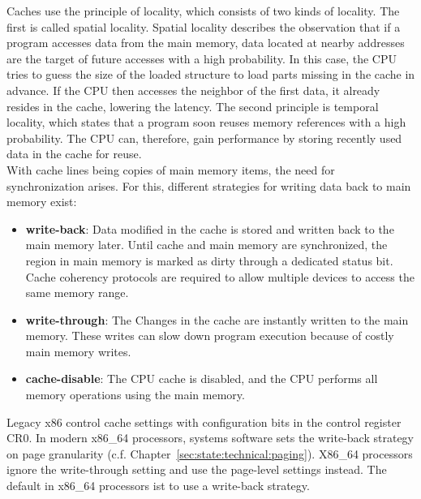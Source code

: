 Caches use the principle of locality, which consists of two kinds of locality.
The first is called spatial locality. Spatial locality describes the observation
that if a program accesses data from the main memory, data located at nearby
addresses are the target of future accesses with a high probability. In this
case, the CPU tries to guess the size of the loaded structure to load parts
missing in the cache in advance. If the CPU then accesses the neighbor of the
first data, it already resides in the cache, lowering the latency. The second
principle is temporal locality, which states that a program soon reuses memory
references with a high probability. The CPU can, therefore, gain performance by
storing recently used data in the cache for reuse.\\

With cache lines being copies of main memory items, the need for synchronization
arises. For this, different strategies for writing data back to main memory
exist:
\begin{itemize}
    \item \textbf{write-back}: Data modified in the cache is stored and written
          back to the main memory later. Until cache and main memory are
          synchronized, the region in main memory is marked as dirty through a
          dedicated status bit. Cache coherency protocols are required to allow
          multiple devices to access the same memory range.
    \item \textbf{write-through}: The Changes in the cache are instantly written
          to the main memory. These writes can slow down program execution
          because of costly main memory writes.
    \item \textbf{cache-disable}: The CPU cache is disabled, and the CPU
          performs all memory operations using the main memory.
\end{itemize}
Legacy x86 control cache settings with configuration bits in the control
register CR0. In modern x86\_64 processors, systems software sets the write-back
strategy on page granularity (c.f. Chapter~\ref{sec:state:technical:paging}).
X86\_64 processors ignore the write-through setting and use the page-level
settings instead. \cite{amd_manual} The default in x86\_64 processors ist to use
a write-back strategy.

